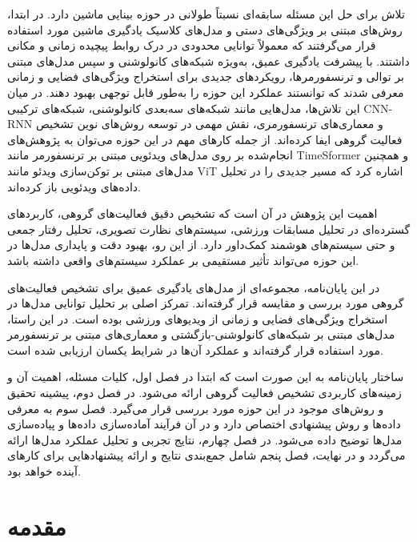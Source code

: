 \documentclass[12pt]{report}
\begin{document}
تلاش برای حل این مسئله سابقه‌ای نسبتاً طولانی در حوزه بینایی ماشین دارد. در ابتدا، روش‌های مبتنی بر ویژگی‌های دستی و مدل‌های کلاسیک یادگیری ماشین مورد استفاده قرار می‌گرفتند که معمولاً توانایی محدودی در درک روابط پیچیده زمانی و مکانی داشتند. با پیشرفت یادگیری عمیق، به‌ویژه شبکه‌های کانولوشنی و سپس مدل‌های مبتنی بر توالی و ترنسفورمرها، رویکردهای جدیدی برای استخراج ویژگی‌های فضایی و زمانی معرفی شدند که توانستند عملکرد این حوزه را به‌طور قابل توجهی بهبود دهند. در میان این تلاش‌ها، مدل‌هایی مانند شبکه‌های سه‌بعدی کانولوشنی، شبکه‌های ترکیبی CNN-RNN و معماری‌های ترنسفورمری، نقش مهمی در توسعه روش‌های نوین تشخیص فعالیت گروهی ایفا کرده‌اند. از جمله کارهای مهم در این حوزه می‌توان به پژوهش‌های انجام‌شده بر روی مدل‌های ویدئویی مبتنی بر ترنسفورمر مانند TimeSformer و همچنین مدل‌های مبتنی بر توکن‌سازی ویدئو مانند ViT اشاره کرد که مسیر جدیدی را در تحلیل داده‌های ویدئویی باز کرده‌اند.

اهمیت این پژوهش در آن است که تشخیص دقیق فعالیت‌های گروهی، کاربردهای گسترده‌ای در تحلیل مسابقات ورزشی، سیستم‌های نظارت تصویری، تحلیل رفتار جمعی و حتی سیستم‌های هوشمند کمک‌داور دارد. از این رو، بهبود دقت و پایداری مدل‌ها در این حوزه می‌تواند تأثیر مستقیمی بر عملکرد سیستم‌های واقعی داشته باشد.

در این پایان‌نامه، مجموعه‌ای از مدل‌های یادگیری عمیق برای تشخیص فعالیت‌های گروهی مورد بررسی و مقایسه قرار گرفته‌اند. تمرکز اصلی بر تحلیل توانایی مدل‌ها در استخراج ویژگی‌های فضایی و زمانی از ویدیوهای ورزشی بوده است. در این راستا، مدل‌های مبتنی بر شبکه‌های کانولوشنی-بازگشتی و معماری‌های مبتنی بر ترنسفورمر مورد استفاده قرار گرفته‌اند و عملکرد آن‌ها در شرایط یکسان ارزیابی شده است.

ساختار پایان‌نامه به این صورت است که ابتدا در فصل اول، کلیات مسئله، اهمیت آن و زمینه‌های کاربردی تشخیص فعالیت گروهی ارائه می‌شود. در فصل دوم، پیشینه تحقیق و روش‌های موجود در این حوزه مورد بررسی قرار می‌گیرد. فصل سوم به معرفی داده‌ها و روش پیشنهادی اختصاص دارد و در آن فرآیند آماده‌سازی داده‌ها و پیاده‌سازی مدل‌ها توضیح داده می‌شود. در فصل چهارم، نتایج تجربی و تحلیل عملکرد مدل‌ها ارائه می‌گردد و در نهایت، فصل پنجم شامل جمع‌بندی نتایج و ارائه پیشنهادهایی برای کارهای آینده خواهد بود.

\tableofcontents
\newpage %

\listoftables
\newpage

\listoffigures
\newpage

\pagestyle{plain}
\setcounter{page}{1}


\chapter{مقدمه}
\end{document}
